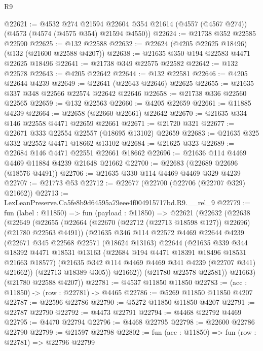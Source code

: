 \begin{lexlean}{R9}
\begin{coremodule}
@22621 := @4532
    @274
    @21594
    @22604
    @354
    @21614
    (@4557 (@4567 @274))
    (@4573 (@4574 (@4575 @354) @21594 @4550))
@22624 := @21738 @352 @22585 @22590
@22625 := @132 @22588
@22632 := @22624 (@4205 @22625 @18496) (@132 (@21600 @22588 @4207))
@22638 := @21635 @350 @194 @22583 @4471 @22625 @18496
@22641 := @21738 @349 @22575 @22582
@22642 := @132 @22578
@22643 := @4205 @22642
@22644 := @132 @22581
@22646 := @4205 @22644 @4239
@22649 := @22641 (@22643 @22646) @22625
@22655 := @21635 @337 @348 @22566 @22574 @22642 @22646
@22658 := @21738 @336 @22560 @22565
@22659 := @132 @22563
@22660 := @4205 @22659
@22661 := @11885 @4239
@22664 := @22658 (@22660 @22661) @22642
@22670 := @21635 @334 @146 @22558 @4471 @22659 @22661
@22671 := @21720 @321
@22677 := @22671 @333 @22554 @22557 (@18695 @13102) @22659
@22683 := @21635 @325 @332 @22552 @4471 @18662 @13102
@22684 := @21625 @323
@22689 := @22684 @146 @4471 @22551 @22661 @18662
@22696 := @21636 @114 @4469 @4469 @11884 @4239 @21648 @21662
@22700 := @22683 (@22689 @22696 (@18576 @4491))
@22706 := @21635 @330 @114 @4469 @4469 @329 @4239
@22707 := @21773 @53
@22712 := @22677 (@22700 (@22706 (@22707 @329) @21662))
@22713 := LexLeanPreserve.Ca5fe8b9d64595a79eee4f004915717bd.R9.__rel_9
@22779 := fun (label : @11850) =>
  fun (payload : @11850) =>
  @22621
    (@22632
      (@22638
        (@22649
          (@22655
            (@22664 (@22670 (@22712 (@22713 @18598 @127)) @22696) (@21780 @22563 @4491))
            (@21635
              @346
              @114
              @22572
              @4469
              @22644
              @4239
              (@22671
                @345
                @22568
                @22571
                (@18624 @13163)
                @22644
                (@21635
                  @339
                  @344
                  @18392
                  @4471
                  @18531
                  @13163
                  (@22684 @194 @4471 @18391 @18496 @18531 @21663 @18577)
                  (@21635 @342 @114 @4469 @4469 @341 @4239 (@22707 @341) @21662))
                (@22713 @18389 @305))
              @21662))
          (@21780 @22578 @22581))
        @21663)
      (@21780 @22588 @4207))
@22781 := @4537 @11850 @11850
@22783 := (acc : @11850) -> (row : @22781) -> @4465
@22786 := @5269 @11850 @11850 @4207
@22787 := @22596 @22786
@22790 := @5272 @11850 @11850 @4207
@22791 := @22787 @22790
@22792 := @4473 @22791
@22794 := @4468 @22792 @4469
@22795 := @4470 @22794
@22796 := @4468 @22795
@22798 := @22600 @22786 @22790
@22799 := @21597 @22798
@22802 := fun (acc : @11850) => fun (row : @22781) => @22796 @22799

\end{coremodule}
\end{lexlean}
